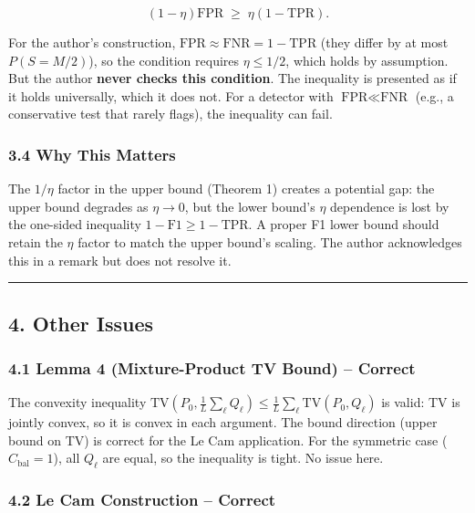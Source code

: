 \documentclass[
  12pt,
]{ctexart}
\begin{document}
\[(1-\eta)\text{FPR} \;\geq\; \eta(1-\text{TPR}).\]

For the author's construction,
\(\text{FPR} \approx \text{FNR} = 1-\text{TPR}\) (they differ by at most
\(P(S=M/2)\)), so the condition requires \(\eta \leq 1/2\), which holds
by assumption. But the author \textbf{never checks this condition}. The
inequality is presented as if it holds universally, which it does not.
For a detector with \(\text{FPR} \ll \text{FNR}\) (e.g., a conservative
test that rarely flags), the inequality can fail.

\subsubsection{3.4 Why This Matters}\label{why-this-matters}

The \(1/\eta\) factor in the upper bound (Theorem 1) creates a potential
gap: the upper bound degrades as \(\eta \to 0\), but the lower bound's
\(\eta\) dependence is lost by the one-sided inequality
\(1-\text{F1} \geq 1-\text{TPR}\). A proper F1 lower bound should retain
the \(\eta\) factor to match the upper bound's scaling. The author
acknowledges this in a remark but does not resolve it.

\begin{center}\rule{0.5\linewidth}{0.5pt}\end{center}

\subsection{4. Other Issues}\label{other-issues}

\subsubsection{4.1 Lemma 4 (Mixture-Product TV Bound) --
Correct}\label{lemma-4-mixture-product-tv-bound-correct}

The convexity inequality
\(\text{TV}(P_0, \frac{1}{L}\sum_\ell Q_\ell) \leq \frac{1}{L}\sum_\ell \text{TV}(P_0, Q_\ell)\)
is valid: TV is jointly convex, so it is convex in each argument. The
bound direction (upper bound on TV) is correct for the Le Cam
application. For the symmetric case (\(C_{\text{bal}}=1\)), all
\(Q_\ell\) are equal, so the inequality is tight. No issue here.

\subsubsection{4.2 Le Cam Construction --
Correct}\label{le-cam-construction-correct}
\end{document}
